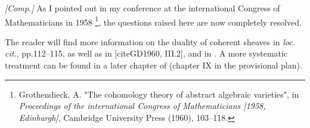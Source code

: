 \begin{remark}\label{fga1-4-remark-ii}
  \emph{[Comp.]}
  As I pointed out in my conference at the international Congress of Mathematicians in 1958 \footnote{Grothendieck, A. "The cohomology theory of abstract algebraic varieties", in \emph{Proceedings of the international Congress of Mathematicians [1958, Edinburgh]}, Cambridge University Press (1960), 103–118.}, the questions raised here are now completely resolved.

  The reader will find more information on the duality of coherent sheaves in \emph{loc. cit.}, pp.112–115, as well as in [cite{GD1960}, III.2], and in \cite{Gro1960b}.
  A more systematic treatment can be found in a later chapter of \cite{GD1960} (chapter IX in the provisional plan).
\end{remark}
